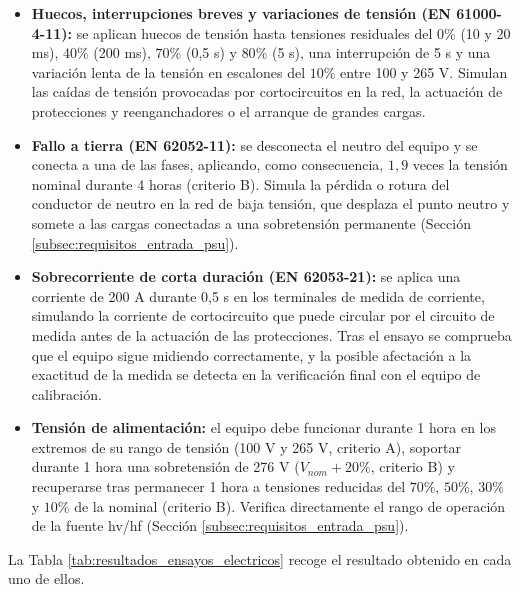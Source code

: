 \begin{itemize}
    \item \textbf{Huecos, interrupciones breves y variaciones de tensión (EN 61000-4-11):} se aplican huecos de tensión hasta tensiones residuales del $0\%$ (10 y 20 ms), $40\%$ (200 ms), $70\%$ (0,5 s) y $80\%$ (5 s), una interrupción de 5 s y una variación lenta de la tensión en escalones del $10\%$ entre 100 y 265 V. Simulan las caídas de tensión provocadas por cortocircuitos en la red, la actuación de protecciones y reenganchadores o el arranque de grandes cargas.
    \item \textbf{Fallo a tierra (EN 62052-11):} se desconecta el neutro del equipo y se conecta a una de las fases, aplicando, como consecuencia, $1,9$ veces la tensión nominal durante 4 horas (criterio B). Simula la pérdida o rotura del conductor de neutro en la red de baja tensión, que desplaza el punto neutro y somete a las cargas conectadas a una sobretensión permanente (Sección \ref{subsec:requisitos_entrada_psu}).
    \item \textbf{Sobrecorriente de corta duración (EN 62053-21):} se aplica una corriente de 200 A durante 0,5 s en los terminales de medida de corriente, simulando la corriente de cortocircuito que puede circular por el circuito de medida antes de la actuación de las protecciones. Tras el ensayo se comprueba que el equipo sigue midiendo correctamente, y la posible afectación a la exactitud de la medida se detecta en la verificación final con el equipo de calibración.
    \item \textbf{Tensión de alimentación:} el equipo debe funcionar durante 1 hora en los extremos de su rango de tensión (100 V y 265 V, criterio A), soportar durante 1 hora una sobretensión de 276 V ($V_{nom} + 20\%$, criterio B) y recuperarse tras permanecer 1 hora a tensiones reducidas del $70\%$, $50\%$, $30\%$ y $10\%$ de la nominal (criterio B). Verifica directamente el rango de operación de la fuente \gls{hv}/\gls{hf} (Sección \ref{subsec:requisitos_entrada_psu}).
\end{itemize}

La Tabla \ref{tab:resultados_ensayos_electricos} recoge el resultado obtenido en cada uno de ellos.

